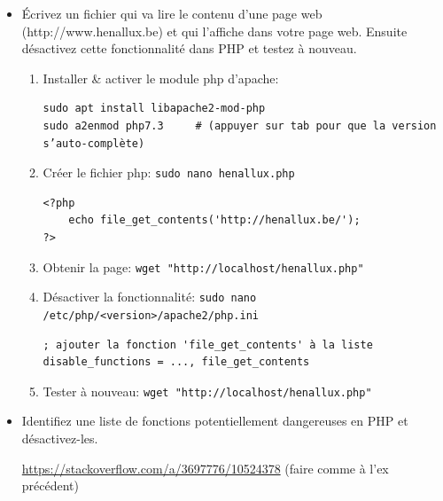 \documentclass[a4paper]{article}
\begin{document}
\begin{itemize}
\item Écrivez un fichier qui va lire le contenu d’une page web (http://www.henallux.be) et qui l’affiche dans votre page web. Ensuite désactivez cette fonctionnalité dans PHP et testez à nouveau.
\begin{example} \begin{enumerate}

\item Installer \& activer le module php d'apache:
\begin{example} \begin{verbatim}
sudo apt install libapache2-mod-php
sudo a2enmod php7.3     # (appuyer sur tab pour que la version s’auto-complète)
\end{verbatim} \end{example}

\item Créer le fichier php: \texttt{sudo nano henallux.php}
\begin{example} \begin{verbatim}
<?php
    echo file_get_contents('http://henallux.be/');
?>
\end{verbatim} \end{example}

\item Obtenir la page: \texttt{wget "http://localhost/henallux.php"}

\item Désactiver la fonctionnalité: \texttt{sudo nano /etc/php/<version>/apache2/php.ini}
\begin{example} \begin{verbatim}
; ajouter la fonction 'file_get_contents' à la liste
disable_functions = ..., file_get_contents
\end{verbatim} \end{example}

\item Tester à nouveau: \texttt{wget "http://localhost/henallux.php"}

\end{enumerate} \end{example}


\item Identifiez une liste de fonctions potentiellement dangereuses en PHP et désactivez-les.
\begin{example}
    \url{https://stackoverflow.com/a/3697776/10524378} (faire comme à l'ex précédent)
\end{example}



\end{itemize}
\end{document}
